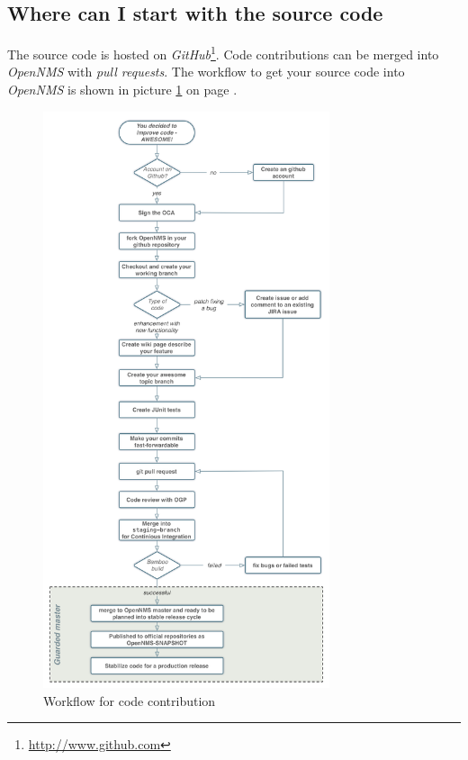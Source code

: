 \subsection*{Where can I start with the source code}
The source code is hosted on \emph{GitHub}\footnote{\url{http://www.github.com}}. 
Code contributions can be merged into \emph{OpenNMS} with \emph{pull requests}. The workflow to get your source code into \emph{OpenNMS} is shown in picture \ref{fig:contrib-workflow} on page \pageref{fig:contrib-workflow}.
\begin{figure}
	\centering
	\includegraphics[width=0.75\textwidth]{images/contribution-workflow.png}
	\caption{Workflow for code contribution}
	\label{fig:contrib-workflow}
\end{figure}

